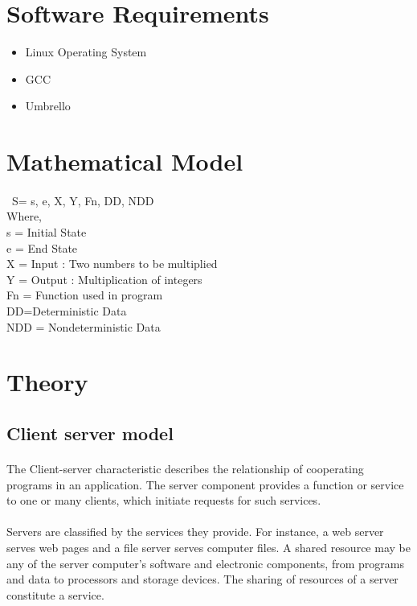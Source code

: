 \documentclass[a4paper,12pt]{article}
\begin{document}
\section{Software Requirements}
	\begin{itemize}
		\item	Linux Operating System
		\item	GCC
		\item	Umbrello
	\end{itemize}
	
\section{Mathematical Model}
	\paragraph{} \
	S= {s, e, X, Y, Fn, DD, NDD}\\
	Where, \\
	s = Initial State\\ 
	e = End State \\
	X = Input : Two numbers to be multiplied\\
	Y = Output : Multiplication of integers\\
	Fn = Function used in program\\
	DD=Deterministic Data \\
	NDD = Nondeterministic Data\\ 
	
\section{Theory}
	\subsection{Client server model}
		\paragraph{} The Client-server characteristic describes the relationship of cooperating programs in an application. The server component provides a function or service to one or many clients, which initiate requests for such services.
		\paragraph{}Servers are classified by the services they provide. For instance, a web server serves web pages and a file server serves computer files. A shared resource may be any of the server computer's software and electronic components, from programs and data to processors and storage devices. The sharing of resources of a server constitute a service.
\end{document}
